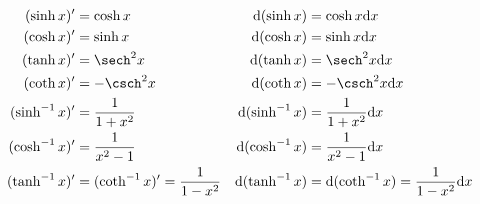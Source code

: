 \documentclass[zihao=-4,linespread=1.8,UTF8,nothm]{aytony_base}
\theoremstyle{definition}
\begin{document}
\begin{appendices}
$$\begin{aligned}
            (\sinh x)'     & = \cosh x                            & \mathrm{d}(\sinh x)     & = \cosh x                           \mathrm{d}x          \\
            (\cosh x)'     & = \sinh x                            & \mathrm{d}(\cosh x)     & = \sinh x                           \mathrm{d}x          \\
            (\tanh x)'     & = \sech^2 x                          & \mathrm{d}(\tanh x)     & = \sech^2 x                        \mathrm{d}x           \\
            (\coth x)'     & = -\csch^2 x                         & \mathrm{d}(\coth x)     & = -\csch^2 x                       \mathrm{d}x           \\
            (\sinh^{-1}x)' & = \dfrac{1}{1+x^2}                   & \mathrm{d}(\sinh^{-1}x) & = \dfrac{1}{1+x^2}                   \mathrm{d}x         \\
            (\cosh^{-1}x)' & = \dfrac{1}{x^2-1}                   & \mathrm{d}(\cosh^{-1}x) & = \dfrac{1}{x^2-1}                   \mathrm{d}x         \\
            (\tanh^{-1}x)' & = (\coth^{-1} x)' = \dfrac{1}{1-x^2} & \mathrm{d}(\tanh^{-1}x) & = \mathrm{d}(\coth^{-1} x) = \dfrac{1}{1-x^2}\mathrm{d}x
        \end{aligned}
    $$


\end{appendices}
\end{document}
